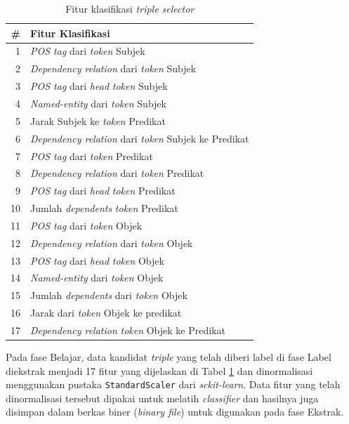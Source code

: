 \begin{table}
\caption{Fitur klasifikasi \textit{triple selector}}
\label{tab:models_features}
\centering
\begin{tabular}{r l}
\hline
\textbf{\#} & \textbf{Fitur Klasifikasi} \\
\hline
1 & \textit{POS tag} dari \textit{token} Subjek \\
2 & \textit{Dependency relation} dari \textit{token} Subjek \\
3 & \textit{POS tag} dari \textit{head} \textit{token} Subjek \\
4 & \textit{Named-entity} dari \textit{token} Subjek \\
5 & Jarak Subjek ke \textit{token} Predikat \\
6 & \textit{Dependency relation} dari \textit{token} Subjek ke Predikat \\
7 & \textit{POS tag} dari \textit{token} Predikat \\
8 & \textit{Dependency relation} dari \textit{token} Predikat \\
9 & \textit{POS tag} dari \textit{head} \textit{token} Predikat \\
10 & Jumlah \textit{dependents} \textit{token} Predikat \\
11 & \textit{POS tag} dari \textit{token} Objek \\
12 & \textit{Dependency relation} dari \textit{token} Objek \\
13 & \textit{POS tag} dari \textit{head} \textit{token} Objek \\
14 & \textit{Named-entity} dari \textit{token} Objek \\
15 & Jumlah \textit{dependents} dari \textit{token} Objek \\
16 & Jarak dari \textit{token} Objek ke predikat \\
17 & \textit{Dependency relation} \textit{token} Objek ke Predikat  \\
\end{tabular}
\end{table}

Pada fase Belajar, data kandidat \textit{triple} yang telah diberi label di fase Label diekstrak menjadi 17 fitur yang dijelaskan di Tabel \ref{tab:models_features} dan dinormalisasi menggunakan pustaka \verb|StandardScaler| dari \textit{sckit-learn}. Data fitur yang telah dinormalisasi tersebut dipakai untuk melatih \textit{classifier} dan hasilnya juga disimpan dalam berkas biner (\textit{binary file}) untuk digunakan pada fase Ekstrak.

